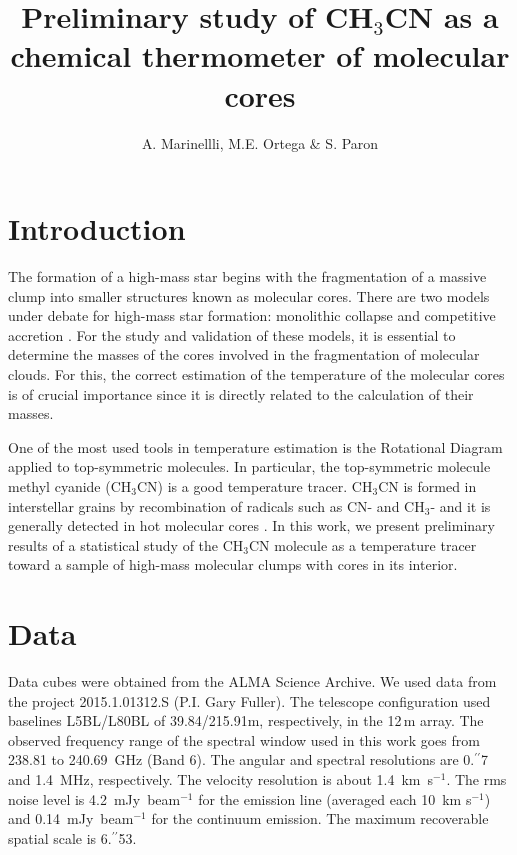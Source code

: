 \documentclass[baaa]{baaa}
\title{Preliminary study of CH$_3$CN as a chemical thermometer of
molecular cores}
\author{A. Marinellli\inst{1},
M.E. Ortega\inst{1} \&
S. Paron\inst{1}
}
\institute{Instituto de Astronom{\'\i}a y F{\'\i}sica del Espacio, CONICET--UBA, Argentina
}
\begin{document}
\maketitle
\section{Introduction}\label{S_intro}

The formation of a high-mass star begins with the fragmentation of a massive clump into smaller structures known as molecular cores. There are two models under debate for high-mass star formation: monolithic collapse \citep{palau2018, moscadelli2021} and competitive accretion \citep{motte18, sch19}.
For the study and validation of these models, it is essential to determine the masses of the cores involved in the fragmentation of molecular clouds. For this, the correct estimation of the temperature of the molecular cores is of crucial importance since it is directly related to the calculation of their masses.

One of the most used tools in temperature estimation is the Rotational Diagram \citep{goldsmith99} applied to top-symmetric molecules. In particular, the top-symmetric molecule methyl cyanide (CH$_3$CN) is a good temperature tracer. CH$_3$CN is formed in interstellar grains by recombination of radicals such as CN- and CH$_3$- \citep{her14} and it is generally detected in hot molecular cores \citep{brouillet2022}. In this work, we present preliminary results of a statistical study of the CH$_3$CN molecule as a temperature tracer toward a sample of high-mass molecular clumps with cores in its interior.

\section{Data}

Data cubes were obtained from the ALMA Science Archive. We used data from the project 2015.1.01312.S (P.I. Gary Fuller). The telescope configuration used baselines  L5BL/L80BL of 39.84/215.91m, respectively,  in the 12\,m array. 
The observed frequency range of the spectral window used in this work goes from 238.81 to 240.69~GHz (Band 6). The angular and spectral resolutions are 0$.\!\!^{\prime\prime}$7 and 1.4~MHz, respectively. The velocity resolution is about 1.4~km~s$^{-1}$. The rms noise level is 4.2~mJy~beam$^{-1}$ for the emission line (averaged each 10~km s$^{-1}$) and 0.14~mJy~beam$^{-1}$ for the continuum emission. The maximum recoverable spatial scale is 6$.\!\!^{\prime\prime}$53. 
\end{document}
